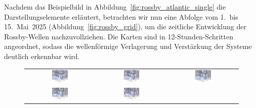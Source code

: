 Nachdem das Beispielbild in Abbildung~\ref{fig:rossby_atlantic_single} die 
Darstellungselemente erläutert, betrachten wir nun eine Abfolge vom 1.\ bis 15.\ Mai~2025 
(Abbildung~\ref{fig:rossby_grid}), um die zeitliche Entwicklung der Rossby-Wellen 
nachzuvollziehen. Die Karten sind in 12-Stunden-Schritten angeordnet, sodass die 
wellenförmige Verlagerung und Verstärkung der Systeme deutlich erkennbar wird.


\begin{figure}
	\centering
	\renewcommand{\arraystretch}{0.5}
	\begin{tabular}{ccc}
		\includegraphics[width=0.32\textwidth, trim=3.1cm 3cm 3.0cm 0.8cm, clip]{papers/rossby/images/data_2025_5_1_00_00_500.pdf} &
		\includegraphics[width=0.32\textwidth, trim=3.1cm 3cm 3.0cm 0.8cm, clip]{papers/rossby/images/data_2025_5_1_12_00_500.pdf} &
		\includegraphics[width=0.32\textwidth, trim=3.1cm 3cm 3.0cm 0.8cm, clip]{papers/rossby/images/data_2025_5_2_00_00_500.pdf}   \\
		\includegraphics[width=0.32\textwidth, trim=3.1cm 3cm 3.0cm 0.8cm, clip]{papers/rossby/images/data_2025_5_2_12_00_500.pdf} &
		\includegraphics[width=0.32\textwidth, trim=3.1cm 3cm 3.0cm 0.8cm, clip]{papers/rossby/images/data_2025_5_3_00_00_500.pdf} &

\end{tabular}
\end{figure}
